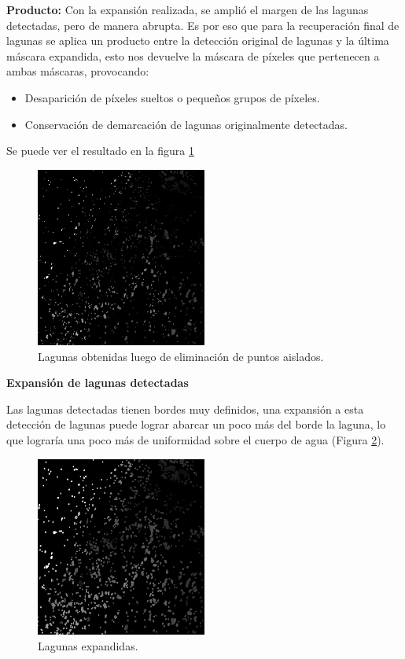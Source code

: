 \documentclass[10pt,a4paper, twoside]{report}
\begin{document}
		\textbf{Producto:} Con la expansión realizada, se amplió el margen de las lagunas detectadas, pero de manera abrupta. Es por eso que para la recuperación final de lagunas se aplica un producto entre la detección original de lagunas y la última máscara expandida, esto nos devuelve la máscara de píxeles que pertenecen a ambas máscaras, provocando:
		
		\begin{itemize}
			\item Desaparición de píxeles sueltos o pequeños grupos de píxeles.
			\item Conservación de demarcación de lagunas originalmente detectadas.
		\end{itemize}		
		
		Se puede ver el resultado en la figura \ref{lagunasDetectadas}

\begin{figure}[H]
   \centering      
   \includegraphics[width=0.5\textwidth]{imagenes/lagunasDetectadas.jpg}
 \caption{Lagunas obtenidas luego de eliminación de puntos aislados.}
 \label{lagunasDetectadas}
\end{figure}		
		
\textbf{Expansión de lagunas detectadas}

Las lagunas detectadas tienen bordes muy definidos, una expansión a esta detección de lagunas puede lograr abarcar un poco más del borde la laguna, lo que lograría una poco más de uniformidad sobre el cuerpo de agua (Figura \ref{dilationLagoons}).

\begin{figure}[H]
   \centering      
   \includegraphics[width=0.5\textwidth]{imagenes/dilationLagoons.jpg}
 \caption{Lagunas expandidas.}
 \label{dilationLagoons}
\end{figure}		
\end{document}
